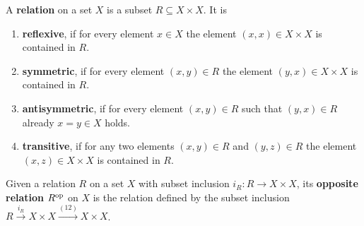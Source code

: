 \documentclass{article}
\begin{document}
	\begin{definition}
		A \textbf{relation} on a set $X$ is a subset $R \subseteq X\times X$. It is
		\begin{enumerate}[$\bullet$]
			\item{
				\textbf{reflexive}, if for every element $x\in X$ the element $(x,x) \in X\times X$ is contained in $R$.
			}
			\item{
				\textbf{symmetric}, if for every element $(x,y)\in R$ the element $(y,x)\in X\times X$ is contained in $R$.
			}
			\item{
				\textbf{antisymmetric}, if for every element $(x,y)\in R$ such that $(y,x)\in R$ already $x=y \in X$ holds.
			}
			\item{
				\textbf{transitive}, if for any two elements $(x,y)\in R$ and $(y,z) \in R$ the element $(x,z) \in X\times X$ is contained in $R$.
			}
		\end{enumerate}
		Given a relation $R$ on a set $X$ with subset inclusion $i_R:R\rightarrow X\times X$, its \textbf{opposite relation} $R^{\text{op}}$ on $X$ is the relation defined by the subset inclusion $R \xrightarrow{i_R} X\times X \xrightarrow{(12)} X\times X$.
	\end{definition}

\end{document}
